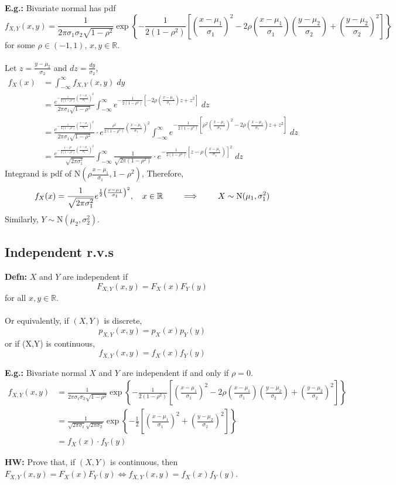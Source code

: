 \documentclass[a4paper]{article}
\newcommand{\n}{\hfill\break}
\newcommand{\defn}[1]{\par\noindent\settowidth{\hangindent}{\textbf{Defn: }}\textbf{Defn: }#1\n}
\newcommand{\eg}[1]{\par\noindent\settowidth{\hangindent}{\textbf{E.g.: }}\textbf{E.g.: }#1\n}
\newcommand{\hw}[1]{\par\noindent\settowidth{\hangindent}{\textbf{HW: }}\textbf{HW: }#1\n}
\newcommand{\reals}{\mathbb{R}}
\newcommand{\R}{\reals}
\begin{document}
\eg{
    Bivariate normal has pdf
    \[f_{X,Y}(x, y)=\frac{1}{2\pi\sigma_1\sigma_2\sqrt{1-\rho^2}}\exp{\left\{-\frac{1}{2(1-\rho^2)}\left[\left(\frac{x-\mu_1}{\sigma_1}\right)^2-2\rho\left(\frac{x-\mu_1}{\sigma_1}\right)\left(\frac{y-\mu_2}{\sigma_2}\right)+\left(\frac{y-\mu_2}{\sigma_2}\right)^2\right]\right\}}\]
    for some $\rho\in(-1, 1)$, $x, y\in\R$.
    \\\\
    Let $z=\frac{y-\mu_2}{\sigma_2}$ and $dz=\frac{dy}{\sigma_2}$,
    \begin{align*}
        f_X(x)&=\int^\infty_{-\infty}f_{X,Y}(x,y)\;dy \\
        &=\frac{e^{-\frac{1}{2(1-\rho^2)}\left(\frac{x-\mu_1}{\sigma_1}\right)^2}}{2\pi\sigma_1\sqrt{1-\rho^2}}\int_{-\infty}^\infty e^{-\frac{1}{2(1-\rho^2)} \left[-2\rho\left(\frac{x-\mu_1}{\sigma_1}\right)z+z^2\right]}\;dz \\
        &=\frac{e^{-\frac{1}{2(1-\rho^2)}\left(\frac{x-\mu_1}{\sigma_1}\right)^2}}{2\pi\sigma_1\sqrt{1-\rho^2}}\cdot e^{\frac{\rho^2}{2(1-\rho^2)}\left(\frac{x-\mu_1}{\sigma_1}\right)^2} \int^\infty_{-\infty} e^{-\frac{1}{2(1-\rho^2)}\left[\rho^2\left(\frac{x-\mu_1}{\sigma_1}\right)^2-2\rho\left(\frac{x-\mu_1}{\sigma_1}\right)z+z^2\right]}\;dz \\
        &=\frac{e^{-\frac{1-\rho^2}{2(1-\rho^2)}\left(\frac{x-\mu_1}{\sigma_1}\right)^2}}{\sqrt{2\pi\sigma_1^2}} \int^\infty_{-\infty} \frac{1}{\sqrt{2\pi(1-\rho^2)}}\cdot e^{-\frac{1}{2(1-\rho^2)}\left[z-\rho\left(\frac{x-\mu_1}{\sigma_1}\right)\right]^2}\;dz
    \end{align*}
    Integrand is pdf of $\text{N}(\rho\frac{x-\mu_1}{\sigma_1}, 1-\rho^2)$, Therefore, 
    \[f_X(x)=\frac{1}{\sqrt{2\pi\sigma^2_1}}e^{\-\frac{1}{2}\left(\frac{x-\mu_1}{\sigma_1}\right)^2}, \quad x\in\R\qquad\implies\qquad X\sim\text{N}(\mu_1, \sigma_1^2)\]
    Similarly, $Y\sim\text{N}(\mu_2, \sigma_2^2)$.
}

\subsection*{Independent r.v.s}
\defn{
    $X$ and $Y$ are independent if 
    \[F_{X,Y}(x, y)=F_X(x)F_Y(y)\]
    for all $x, y\in\R$.
    \\\\
    Or equivalently, if $(X, Y)$ is discrete,
    \[p_{X,Y}(x, y)=p_X(x)p_Y(y)\]
    or if (X,Y) is continuous,
    \[f_{X,Y}(x,y)=f_X(x)f_Y(y)\]
}

\eg{
    Bivariate normal $X$ and $Y$ are independent if and only if $\rho=0$.
    \begin{align*}
        f_{X,Y}(x, y)&=\frac{1}{2\pi\sigma_1\sigma_2\sqrt{1-\rho^2}}\exp{\left\{-\frac{1}{2(1-\rho^2)}\left[\left(\frac{x-\mu_1}{\sigma_1}\right)^2-2\rho\left(\frac{x-\mu_1}{\sigma_1}\right)\left(\frac{y-\mu_2}{\sigma_2}\right)+\left(\frac{y-\mu_2}{\sigma_2}\right)^2\right]\right\}} \\
        &=\frac{1}{\sqrt{2\pi\sigma_1}\sqrt{2\pi\sigma_2}}\exp{\left\{-\frac{1}{2}\left[\left(\frac{x-\mu_1}{\sigma_1}\right)^2+\left(\frac{y-\mu_2}{\sigma_2}\right)^2\right]\right\}} \\
        &=f_X(x)\cdot f_Y(y)
    \end{align*}
}

\hw{
    Prove that, if $(X, Y)$ is continuous, then $F_{X,Y}(x, y)=F_X(x)F_Y(y)\iff f_{X,Y}(x, y)=f_X(x)f_Y(y)$.
}
\end{document}
